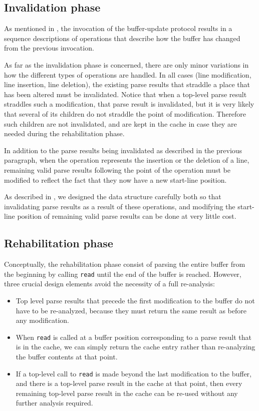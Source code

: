 \subsection{Invalidation phase}

As mentioned in , the invocation of
the buffer-update protocol results in a sequence descriptions of
operations that describe how the buffer has changed from the previous
invocation.

As far as the invalidation phase is concerned, there are only minor
variations in how the different types of operations are handled.  In
all cases (line modification, line insertion, line deletion), the
existing parse results that straddle a place that has been altered
must be invalidated.  Notice that when a top-level parse result
straddles such a modification, that parse result is invalidated, but
it is very likely that several of its children do not straddle the
point of modification.  Therefore such children are not invalidated,
and are kept in the cache in case they are needed during the
rehabilitation phase.

In addition to the parse results being invalidated as described in the
previous paragraph, when the operation represents the insertion or the
deletion of a line, remaining valid parse results following the point
of the operation must be modified to reflect the fact that they now
have a new start-line position.

As described in , we designed the
data structure carefully both so that invalidating parse results as a
result of these operations, and modifying the start-line position of
remaining valid parse results can be done at very little cost.

\subsection{Rehabilitation phase}

Conceptually, the rehabilitation phase consist of parsing the entire
buffer from the beginning by calling \texttt{read} until the end of
the buffer is reached.  However, three crucial design elements avoid
the necessity of a full re-analysis:

\begin{itemize}
\item Top level parse results that precede the first modification to
  the buffer do not have to be re-analyzed, because they must return
  the same result as before any modification.
\item When \texttt{read} is called at a buffer position corresponding
  to a parse result that is in the cache, we can simply return the
  cache entry rather than re-analyzing the buffer contents at that
  point.
\item If a top-level call to \texttt{read} is made beyond the last
  modification to the buffer, and there is a top-level parse result in
  the cache at that point, then every remaining top-level parse result
  in the cache can be re-used without any further analysis required.
\end{itemize}
